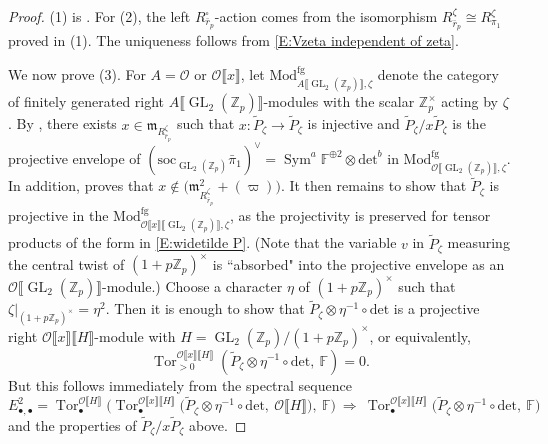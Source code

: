 \documentclass[12pt]{amsart}
\theoremstyle{definition}
\numberwithin{equation}{subsection}
\def\calO{\mathcal{O}}
\def\gothm{\mathfrak{m}}
\def\FF{\mathbb{F}}
\def\ZZ{\mathbb{Z}}
\DeclareMathOperator{\GL}{GL}
\DeclareMathOperator{\Sym}{Sym}
\DeclareMathOperator{\Tor}{Tor}
\newcommand{\Mod}{\mathrm{Mod}}
\renewcommand{\det}{\mathrm{det}}
\newcommand{\soc}{\mathrm{soc}}
\begin{document}
\begin{proof}
(1) is \cite[Corollary~8.7]{paskunas-functor}. For (2), the left $R_{\bar r_p}^\square$-action comes from the isomorphism $R_{\bar r_p}^\zeta \cong R_{\pi_1}^\zeta$ proved in (1). The uniqueness follows from \eqref{E:Vzeta independent of zeta}. 

We now prove (3). For $A = \calO$ or $\calO\llbracket x\rrbracket$, let $\Mod_{A\llbracket \GL_2(\ZZ_p)\rrbracket, \zeta}^\mathrm{fg}$ denote the category of finitely generated right $A\llbracket\GL_2(\ZZ_p)\rrbracket$-modules with the scalar $\ZZ_p^\times$ acting by $\zeta$.
By \cite[Theorem~5.2]{paskunas-BM}, there exists $x \in \gothm_{R^\zeta_{\bar r_p}}$ such that $x: \widetilde P_\zeta \to \widetilde P_\zeta$ is injective and $\widetilde P_\zeta / x\widetilde P_\zeta$ is the projective envelope of $(\soc_{\GL_2(\ZZ_p)}\bar{\pi}_1)^\vee = \Sym^a \FF^{\oplus 2} \otimes \det^b$ in $\Mod_{\calO\llbracket \GL_2(\ZZ_p)\rrbracket, \zeta}^\mathrm{fg}$. In addition, \cite[Theorem~3.3(iii)]{hu-paskunas} proves that $x \notin \big(\gothm^2_{R^\zeta_{\bar r_p}}+(\varpi)\big)$.
It then remains to show that $\widetilde P_\zeta$ is projective in the $\Mod_{\calO\llbracket x \rrbracket\llbracket \GL_2(\ZZ_p)\rrbracket, \zeta}^\mathrm{fg}$, as the projectivity is preserved for tensor products of the form in \eqref{E:widetilde P}. (Note that the variable $v$ in $\widetilde P_\zeta$ measuring the central twist of $(1+p\ZZ_p)^\times$ is ``absorbed" into the projective envelope as an $\calO\llbracket\GL_2(\ZZ_p)\rrbracket$-module.)
Choose a character $\eta$ of $(1+p\ZZ_p)^\times$ such that $\zeta|_{(1+p\ZZ_p)^\times} = \eta^2$. Then it is enough to show that $\widetilde P_\zeta \otimes \eta^{-1}\circ \det$ is a projective right $\calO\llbracket x\rrbracket\llbracket H \rrbracket$-module with $H= \GL_2(\ZZ_p)/(1+p\ZZ_p)^\times$, or equivalently, 
$$
\Tor_{>0}^{\calO\llbracket x\rrbracket\llbracket H\rrbracket}(\widetilde P_\zeta \otimes \eta^{-1}\circ \det, \ \FF) = 0.
$$
But this follows immediately from the spectral sequence 
$$
E^2_{\bullet, \bullet} =
\Tor_\bullet^{\calO\llbracket H\rrbracket}\Big( \Tor_\bullet^{\calO\llbracket  x \rrbracket\llbracket H\rrbracket} \big( \widetilde P_\zeta \otimes \eta^{-1}\circ \det, \ \calO\llbracket H\rrbracket\big), \ \FF \Big)\ \Rightarrow \ \Tor_\bullet^{\calO\llbracket x\rrbracket\llbracket H\rrbracket}\big(\widetilde P_\zeta \otimes \eta^{-1}\circ \det, \ \FF\big)
$$
and the properties of $\widetilde P_\zeta/x\widetilde P_\zeta$ above.
\end{proof}
\end{document}
